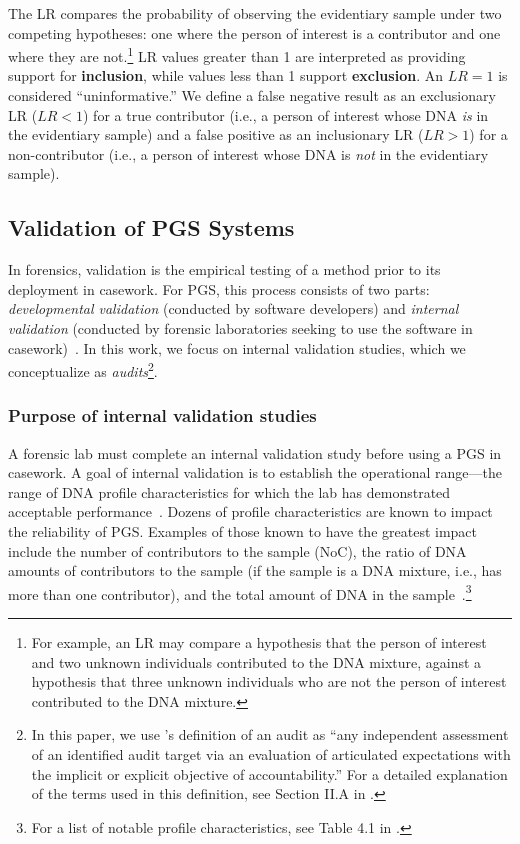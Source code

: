 The LR compares the probability of observing the evidentiary sample under two competing hypotheses: one where the person of interest is a contributor and one where they are not.\footnote{For example, an LR may compare a hypothesis that the person of interest and two unknown individuals contributed to the DNA mixture, against a hypothesis that three unknown individuals who are not the person of interest contributed to the DNA mixture.} LR values greater than 1 are interpreted as providing support for \textbf{inclusion}, while values less than 1 support \textbf{exclusion}. An $LR = 1$ is considered ``uninformative.'' We define a false negative result as an exclusionary LR ($LR < 1$) for a true contributor (i.e., a person of interest whose DNA \textit{is} in the evidentiary sample) and a false positive as an inclusionary LR ($LR > 1$) for a non-contributor (i.e., a person of interest whose DNA is \textit{not} in the evidentiary sample). 


\subsection{Validation of PGS Systems}
\label{sec:background-pgs-validation}
In forensics, validation is the empirical testing of a method prior to its deployment in casework. For PGS, this process consists of two parts: \emph{developmental validation} (conducted by software developers) and \emph{internal validation} (conducted by forensic laboratories seeking to use the software in casework)~\cite{butler2024dna, coble2019probabilistic}. In this work, we focus on internal validation studies, which we conceptualize as \textit{audits}\footnote{In this paper, we use \citet{birhane2024ai}'s definition of an audit as ``any independent assessment of an identified audit target via an evaluation of articulated expectations with the implicit or explicit objective of accountability.'' For a detailed explanation of the terms used in this definition, see Section II.A in \citet{birhane2024ai}.}. 


\subsubsection{Purpose of internal validation studies} 
A forensic lab must complete an internal validation study before using a PGS in casework. A goal of internal validation is to establish the operational range---the range of DNA profile characteristics for which the lab has demonstrated acceptable performance~\cite{butler2024dna}. Dozens of profile characteristics are known to impact the reliability of PGS. Examples of those known to have the greatest impact include the number of contributors to the sample (NoC), the ratio of DNA amounts of contributors to the sample (if the sample is a DNA mixture, i.e., has more than one contributor), and the total amount of DNA in the sample~\cite{butler2024dna}.\footnote{For a list of notable profile characteristics, see Table 4.1 in \citet{butler2024dna}.} 



